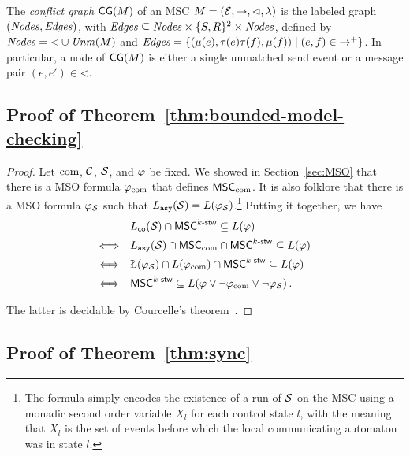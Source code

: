 \begin{definition}
	The \emph{conflict graph} $\mathsf{CG}(M)$ of an MSC $M = (\mathcal{E}, \rightarrow, \lhd, \lambda)$ is the labeled graph $(\mathit{Nodes}, \mathit{Edges})$, with $\mathit{Edges} \subseteq \mathit{Nodes} \times \{S,R\}^2 \times \mathit{Nodes}$, defined by
	$\mathit{Nodes} = {\lhd} \cup \mathit{Unm}(M)$ and $\mathit{Edges} = \{(\mu(e),\tau(e)\tau(f),\mu(f)) \mid (e,f) \in {\to^+}\}$.
In particular, a node of $\mathsf{CG}(M)$ is either a single unmatched send event or a message pair $(e,e') \in {\lhd}$.
\end{definition}


\subsection{Proof of Theorem~\ref{thm:bounded-model-checking}}


\thmBoundedMC

\begin{proof}
   Let $\textup{com}$, $\mathcal{C}$, $\mathcal{S}$, and $\varphi$ 
   be fixed. We showed in Section~\ref{sec:MSO} 
   that there is a MSO formula
   $\varphi_{\textup{com}}$
   that defines $\mathsf{MSC}_{\textup{com}}$.
   It is also folklore that there is a MSO formula
   $\varphi_{\mathcal{S}}$ such that
   $L_{\mathtt{asy}}(\mathcal{S})=L(\varphi_{\mathcal{S}})$.\footnote{The formula
   simply encodes the existence of a run of $\mathcal{S}$ on the MSC
   using a monadic second order variable $X_l$ for each control
   state $l$, with the meaning that $X_l$ is the set of events
   before which the local communicating automaton was in state $l$.}
   Putting it together, we have
    \[\begin{array}{rl}
    &\coL{\System} \cap \stwMSCs{k} \subseteq L(\amsoformula)\\[1ex]
    \Longleftrightarrow &\asyL{\System} \cap \MSCclassofcom{\comsymb} \cap \stwMSCs{k} \subseteq L(\phi)\\[1ex]
    \Longleftrightarrow &\L(\amsoformula_{\System}) \cap L(\msoformulaofcom{\comsymb}) \cap \stwMSCs{k} \subseteq L(\phi)\\[1ex]
    \Longleftrightarrow &\stwMSCs{k} \subseteq L(\phi \vee \neg \msoformulaofcom{\comsymb}\vee\neg\amsoformula_{\System})\,.
    \end{array}\]

    The latter is decidable by Courcelle's theorem~\cite{Courcelle10}.
\end{proof}


\subsection{Proof of Theorem~\ref{thm:sync}}
\label{apx:sync}



